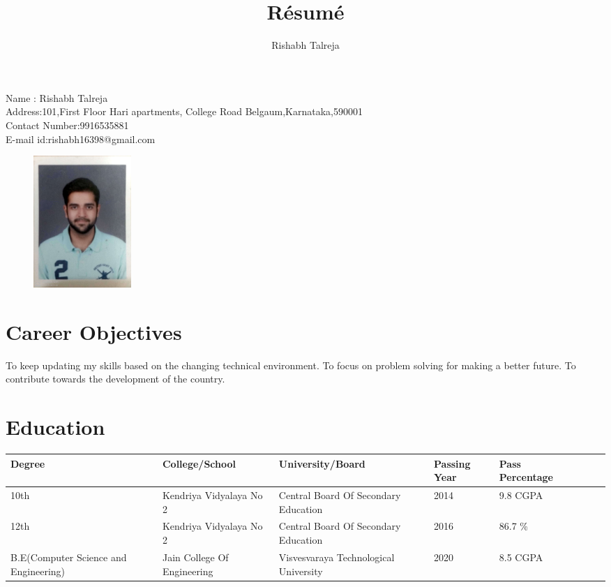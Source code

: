 \documentclass{article}
\begin{document}
	\title{R\'esum\'e}
	\author{Rishabh Talreja}
	\maketitle
	Name : Rishabh Talreja\\
   	Address:101,First Floor Hari apartments, College Road Belgaum,Karnataka,590001\\
   	Contact Number:9916535881\\
   	E-mail id:rishabh16398@gmail.com
		\begin{figure}[h]
		\hspace{10cm}
		\includegraphics[height=5cm]{pic.jpg}
	\end{figure}
	\section{Career Objectives}
To keep updating my skills based on the changing technical environment. To focus on problem
solving for making a better future. To contribute towards the development of the country.
	\section{Education}
{
	\begin{table}[h]
		\begin{adjustbox}{max width=470pt}
			\begin{tabular}{|p{4cm}|l |l| p{3cm}|l| l| p{1cm} | l||}
				\hline
				\rule{0pt}{4ex}
				\textbf{Degree} & \textbf{College/School} & \textbf{University/Board} & \textbf{Passing Year} & \textbf{Pass Percentage} \\
				\hline
				\rule{0pt}{4ex}
				10th & Kendriya Vidyalaya No 2 & Central Board Of Secondary Education & 2014 & 9.8 CGPA\\
				\hline
				\rule{0pt}{4ex}
				12th & Kendriya Vidyalaya No 2 & Central Board Of Secondary Education & 2016 & 86.7 \% \\
				\hline
				\rule{0pt}{4ex}
				B.E(Computer Science and Engineering) & Jain College Of Engineering & 
				Visvesvaraya
				Technological
				University 
				& 2020 & 8.5 CGPA\\
				\hline
			\end{tabular}
		\end{adjustbox}
	\end{table}
}
\end{document}
